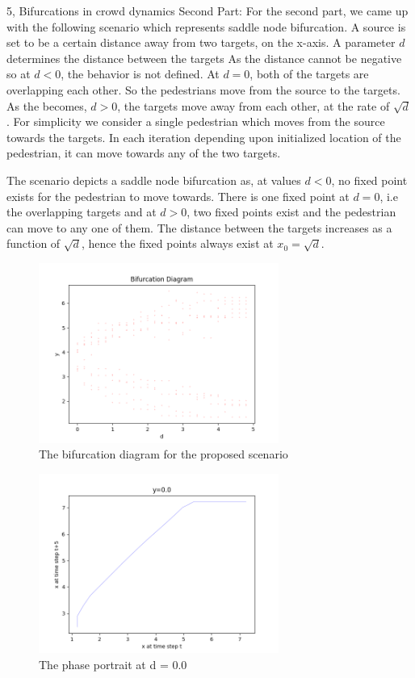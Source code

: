 \documentclass[10pt,a4paper]{article}
\begin{document}
\begin{task}{5, Bifurcations in crowd dynamics}
Second Part:
For the second part, we came up with the following scenario which represents saddle node bifurcation. A source is set to be a certain distance away from two targets, on the x-axis. A parameter $d$ determines the distance between the targets As the distance cannot be negative so at $d < 0$, the behavior is not defined. At $d=0$, both of the targets are overlapping each other. So the pedestrians move from the source to the targets. As the becomes, $d > 0$, the targets move away from each other, at the rate of $\sqrt{d}$. For simplicity we consider a single pedestrian which moves from the source towards the targets. In each iteration depending upon initialized location of the pedestrian, it can move towards any of the two targets.


The scenario depicts a saddle node bifurcation as, at values $d < 0$, no fixed point exists for the pedestrian to move towards. There is one fixed point at $d = 0$, i.e the overlapping targets and at $d > 0$, two fixed points exist and the pedestrian can move to any one of them. The distance between the targets increases as a function of $\sqrt{d}$, hence the fixed points always exist at $x_{0}=\sqrt{d}$.

\begin{figure}[H]
    \centering
    \includegraphics[width=0.7\textwidth]{../plots/task5/saddle_bifurcation.png}
    \caption{The bifurcation diagram for the proposed scenario}
    \label{fig:part2_bifurcation}
\end{figure}

\begin{figure}[H]
    \centering
    \includegraphics[width=0.7\textwidth]{../plots/task5/0_phase_portrait_y_0_0_second_part.png}
    \caption{The phase portrait at d = 0.0}
    \label{fig:part2_bifurcation}
\end{figure}


\end{task}
\end{document}
